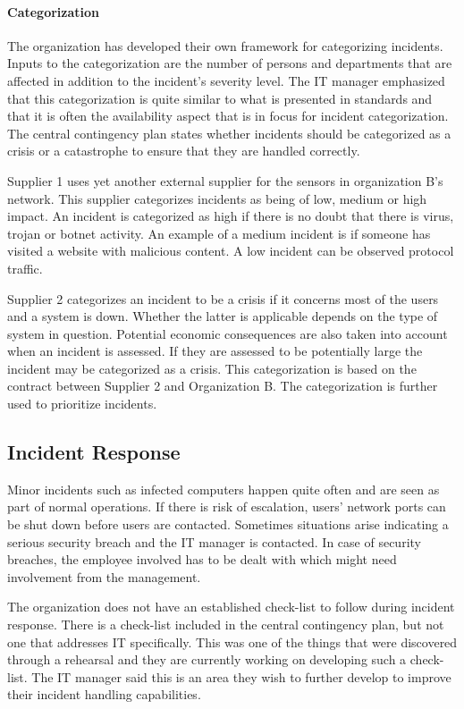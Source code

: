 \documentclass[b5paper, twoside, openright, 11pt]{report}
\begin{document}
\paragraph{Categorization}
The organization has developed their own framework for categorizing incidents. Inputs to the categorization are the number of persons and departments that are affected in addition to the incident's severity level. The IT manager emphasized that this categorization is quite similar to what is presented in standards and that it is often the availability aspect that is in focus for incident categorization. The central contingency plan states whether incidents should be categorized as a crisis or a catastrophe to ensure that they are handled correctly.

Supplier 1 uses yet another external supplier for the sensors in organization B's network. This supplier categorizes incidents as being of low, medium or high impact. An incident is categorized as high if there is no doubt that there is virus, trojan or botnet activity. An example of a medium incident is if someone has visited a website with malicious content. A low incident can be observed protocol traffic.

Supplier 2 categorizes an incident to be a crisis if it concerns most of the users and a system is down. Whether the latter is applicable depends on the type of system in question. Potential economic consequences are also taken into account when an incident is assessed. If they are assessed to be potentially large the incident may be categorized as a crisis. This categorization is based on the contract between Supplier 2 and Organization B. The categorization is further used to prioritize incidents.

\subsection{Incident Response}
Minor incidents such as infected computers happen quite often and are seen as part of normal operations. If there is risk of escalation, users' network ports can be shut down before users are contacted. Sometimes situations arise indicating a serious security breach and the IT manager is contacted. In case of security breaches, the employee involved has to be dealt with which might need involvement from the management.

The organization does not have an established check-list to follow during incident response. There is a check-list included in the central contingency plan, but not one that addresses IT specifically. This was one of the things that were discovered through a rehearsal and they are currently working on developing such a check-list. The IT manager said this is an area they wish to further develop to improve their incident handling capabilities. 
\end{document}
